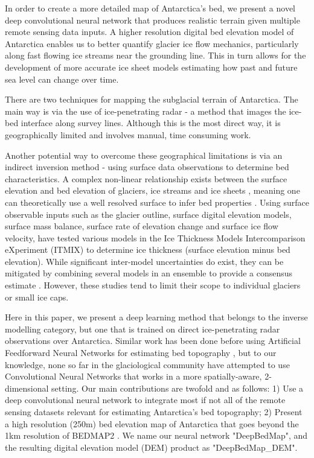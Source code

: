 \documentclass[tc, manuscript]{copernicus}
\begin{document}


\introduction  %

In order to create a more detailed map of Antarctica's bed, we present a novel deep convolutional neural network that produces realistic terrain given multiple remote sensing data inputs.
A higher resolution digital bed elevation model of Antarctica enables us to better quantify glacier ice flow mechanics, particularly along fast flowing ice streams near the grounding line.
This in turn allows for the development of more accurate ice sheet models estimating how past and future sea level can change over time.

There are two techniques for mapping the subglacial terrain of Antarctica.
The main way is via the use of ice-penetrating radar - a method that images the ice-bed interface along survey lines.
Although this is the most direct way, it is geographically limited and involves manual, time consuming work.

Another potential way to overcome these geographical limitations is via an indirect inversion method - using surface data observations to determine bed characteristics.
A complex non-linear relationship exists between the surface elevation and bed elevation of glaciers, ice streams and ice sheets \citep{Raymondrelationshipsurfacebasal2005}, meaning one can theoretically use a well resolved surface to infer bed properties \citep[e.g.][]{Farinottimethodestimateice2009}.
Using surface observable inputs such as the glacier outline, surface digital elevation models, surface mass balance, surface rate of elevation change and surface ice flow velocity, \citet{FarinottiHowaccurateare2017} have tested various models in the Ice Thickness Models Intercomparison eXperiment (ITMIX) to determine ice thickness (surface elevation minus bed elevation).
While significant inter-model uncertainties do exist, they can be mitigated by combining several models in an ensemble to provide a consensus estimate \citep{Farinotticonsensusestimateice2019}.
However, these studies tend to limit their scope to individual glaciers or small ice caps.

Here in this paper, we present a deep learning method that belongs to the inverse modelling category, but one that is trained on direct ice-penetrating radar observations over Antarctica.
Similar work has been done before using Artificial Feedforward Neural Networks for estimating bed topography \citep[e.g.][]{ClarkeNeuralNetworksApplied2009,MonnierInferencebedtopography2018}, but to our knowledge, none so far in the glaciological community have attempted to use Convolutional Neural Networks that works in a more spatially-aware, 2-dimensional setting.
Our main contributions are twofold and as follows:
1) Use a deep convolutional neural network to integrate most if not all of the remote sensing datasets relevant for estimating Antarctica's bed topography;
2) Present a high resolution (250m) bed elevation map of Antarctica that goes beyond the 1km resolution of BEDMAP2 \citep{FretwellBedmap2improvedice2013}.
We name our neural network "DeepBedMap", and the resulting digital elevation model (DEM) product as "DeepBedMap\_DEM".
\end{document}
